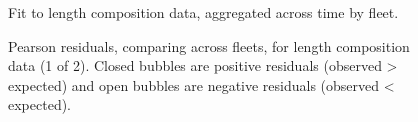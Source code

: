 \documentclass[
]{scrartcl}
\begin{document}
\begin{figure}


\caption{\label{fig-agglencomps}Fit to length composition data,
aggregated across time by fleet.}

\end{figure}%

\begin{figure}


\caption{\label{fig-pearsonlenfit1}Pearson residuals, comparing across
fleets, for length composition data (1 of 2). Closed bubbles are
positive residuals (observed \textgreater{} expected) and open bubbles
are negative residuals (observed \textless{} expected).}

\end{figure}%
\end{document}
